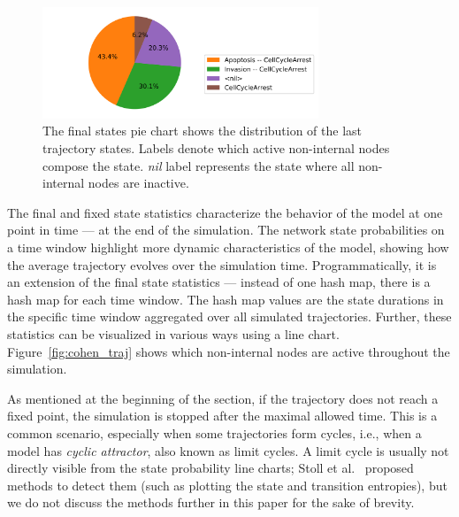 \documentclass[sn-mathphys-num]{sn-jnl}%
\begin{document}
\begin{figure}%
    \centering
    \includegraphics[width=3.25in]{img/cohen_piechart.png}
    \caption{The final states pie chart shows the distribution of the last trajectory states. Labels denote which active non-internal nodes compose the state. \emph{nil} label represents the state where all non-internal nodes are inactive.}
    \label{fig:cohen_final}
\end{figure}

The final and fixed state statistics characterize the behavior of the model at one point in time --- at the end of the simulation. The network state probabilities on a time window highlight more dynamic characteristics of the model, showing how the average trajectory evolves over the simulation time. Programmatically, it is an extension of the final state statistics --- instead of one hash map, there is a hash map for each time window. The hash map values are the state durations in the specific time window aggregated over all simulated trajectories. Further, these statistics can be visualized in various ways using a line chart. Figure~\ref{fig:cohen_traj} shows which non-internal nodes are active throughout the simulation.

As mentioned at the beginning of the section, if the trajectory does not reach a fixed point, the simulation is stopped after the maximal allowed time. This is a common scenario, especially when some trajectories form cycles, i.e., when a model has \emph{cyclic attractor}, also known as limit cycles. A limit cycle is usually not directly visible from the state probability line charts; Stoll et al.~\cite{stoll2012continuous} proposed methods to detect them (such as plotting the state and transition entropies), but we do not discuss the methods further in this paper for the sake of brevity. 
\end{document}
